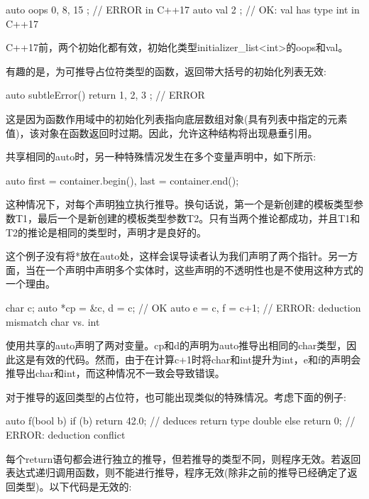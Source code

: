 \begin{cpp}
auto oops { 0, 8, 15 }; // ERROR in C++17
auto val { 2 }; // OK: val has type int in C++17
\end{cpp}

C++17前，两个初始化都有效，初始化类型initializer\_list<int>的oops和val。

有趣的是，为可推导占位符类型的函数，返回带大括号的初始化列表无效:

\begin{cpp}
auto subtleError() {
	return { 1, 2, 3 }; // ERROR
}
\end{cpp}

这是因为函数作用域中的初始化列表指向底层数组对象(具有列表中指定的元素值)，该对象在函数返回时过期。因此，允许这种结构将出现悬垂引用。

共享相同的auto时，另一种特殊情况发生在多个变量声明中，如下所示:

\begin{cpp}
auto first = container.begin(), last = container.end();
\end{cpp}

这种情况下，对每个声明独立执行推导。换句话说，第一个是新创建的模板类型参数T1，最后一个是新创建的模板类型参数T2。只有当两个推论都成功，并且T1和T2的推论是相同的类型时，声明才是良好的。

\begin{notice}这个例子没有将*放在auto处，这样会误导读者认为我们声明了两个指针。另一方面，当在一个声明中声明多个实体时，这些声明的不透明性也是不使用这种方式的一个理由。
\end{notice}

\begin{cpp}
char c;
auto *cp = &c, d = c; // OK
auto e = c, f = c+1; // ERROR: deduction mismatch char vs. int
\end{cpp}

使用共享的auto声明了两对变量。cp和d的声明为auto推导出相同的char类型，因此这是有效的代码。然而，由于在计算c+1时将char和int提升为int，e和f的声明会推导出char和int，而这种情况不一致会导致错误。

对于推导的返回类型的占位符，也可能出现类似的特殊情况。考虑下面的例子:

\begin{cpp}
auto f(bool b) {
	if (b) {
		return 42.0; // deduces return type double
	} else {
		return 0; // ERROR: deduction conflict
	}
}
\end{cpp}

每个return语句都会进行独立的推导，但若推导的类型不同，则程序无效。若返回表达式递归调用函数，则不能进行推导，程序无效(除非之前的推导已经确定了返回类型)。以下代码是无效的:

